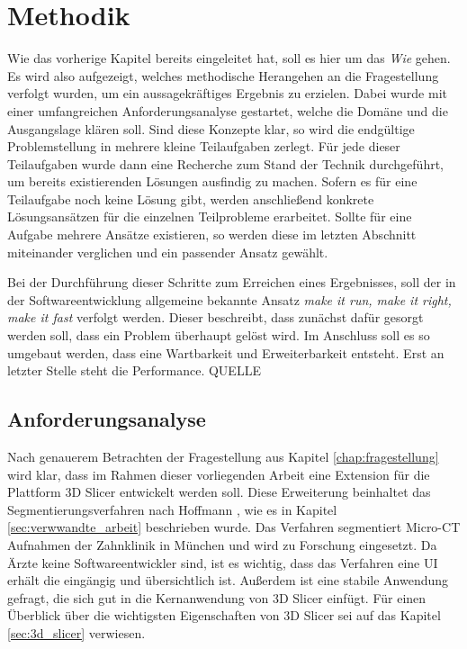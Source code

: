 \chapter{Methodik}
\label{chap:methodik} Wie das vorherige Kapitel bereits eingeleitet hat, soll es
hier um das \textit{Wie} gehen. Es wird also aufgezeigt, welches methodische Herangehen
an die Fragestellung verfolgt wurden, um ein aussagekräftiges Ergebnis zu
erzielen. Dabei wurde mit einer umfangreichen Anforderungsanalyse gestartet,
welche die Domäne und die Ausgangslage klären soll. Sind diese Konzepte klar, so
wird die endgültige Problemstellung in mehrere kleine Teilaufgaben zerlegt. Für jede
dieser Teilaufgaben wurde dann eine Recherche zum Stand der Technik durchgeführt,
um bereits existierenden Lösungen ausfindig zu machen. Sofern es für eine Teilaufgabe
noch keine Lösung gibt, werden anschließend konkrete Lösungsansätzen für die
einzelnen Teilprobleme erarbeitet. Sollte für eine Aufgabe mehrere Ansätze existieren,
so werden diese im letzten Abschnitt miteinander verglichen und ein passender
Ansatz gewählt.

Bei der Durchführung dieser Schritte zum Erreichen eines Ergebnisses, soll der in
der Softwareentwicklung allgemeine bekannte Ansatz \textit{make it run, make it right,
make it fast} verfolgt werden. Dieser beschreibt, dass zunächst dafür gesorgt
werden soll, dass ein Problem überhaupt gelöst wird. Im Anschluss soll es so
umgebaut werden, dass eine Wartbarkeit und Erweiterbarkeit entsteht. Erst an
letzter Stelle steht die Performance. QUELLE

\section{Anforderungsanalyse}
\label{sec:anforderungsanalyse} Nach genauerem Betrachten der Fragestellung aus
Kapitel \ref{chap:fragestellung} wird klar, dass im Rahmen dieser vorliegenden Arbeit
eine Extension für die Plattform 3D Slicer entwickelt werden soll. Diese
Erweiterung beinhaltet das Segmentierungsverfahren nach Hoffmann \citep[vgl.][]{hoffmann2020},
wie es in Kapitel \ref{sec:verwwandte_arbeit} beschrieben wurde. Das Verfahren segmentiert
Micro-CT Aufnahmen der Zahnklinik in München und wird zu Forschung eingesetzt.
Da Ärzte keine Softwareentwickler sind, ist es wichtig, dass das Verfahren eine
UI erhält die eingängig und übersichtlich ist. Außerdem ist eine stabile Anwendung
gefragt, die sich gut in die Kernanwendung von 3D Slicer einfügt. Für einen Überblick
über die wichtigsten Eigenschaften von 3D Slicer sei auf das Kapitel \ref{sec:3d_slicer}
verwiesen.

